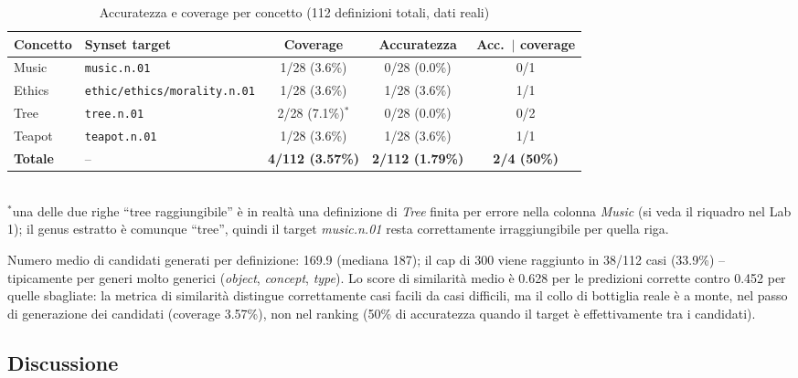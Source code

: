 \documentclass[12pt,a4paper]{article}
\begin{document}
\begin{table}[H]
  \centering
  \caption{Accuratezza e coverage per concetto (112 definizioni totali, dati reali)}
  \begin{tabular}{llccc}
    \toprule
    \textbf{Concetto} & \textbf{Synset target} & \textbf{Coverage} & \textbf{Accuratezza} & \textbf{Acc.\ $|$ coverage} \\
    \midrule
    Music  & \texttt{music.n.01}                              & 1/28 (3.6\%) & 0/28 (0.0\%) & 0/1 \\
    Ethics & \texttt{ethic/ethics/morality.n.01}               & 1/28 (3.6\%) & 1/28 (3.6\%) & 1/1 \\
    Tree   & \texttt{tree.n.01}                                & 2/28 (7.1\%)$^*$ & 0/28 (0.0\%) & 0/2 \\
    Teapot & \texttt{teapot.n.01}                              & 1/28 (3.6\%) & 1/28 (3.6\%) & 1/1 \\
    \midrule
    \textbf{Totale} & -- & \textbf{4/112 (3.57\%)} & \textbf{2/112 (1.79\%)} & \textbf{2/4 (50\%)} \\
    \bottomrule
  \end{tabular}
  \\[0.3em]
  {\footnotesize $^*$una delle due righe ``tree raggiungibile'' \`e in realt\`a una definizione di \textit{Tree} finita per errore nella colonna \textit{Music} (si veda il riquadro nel Lab 1); il genus estratto \`e comunque ``tree'', quindi il target \emph{music.n.01} resta correttamente irraggiungibile per quella riga.}
\end{table}

Numero medio di candidati generati per definizione: 169.9 (mediana 187); il cap di 300 viene raggiunto in 38/112 casi (33.9\%) -- tipicamente per generi molto generici (\textit{object}, \textit{concept}, \textit{type}). Lo score di similarit\`a medio \`e 0.628 per le predizioni corrette contro 0.452 per quelle sbagliate: la metrica di similarit\`a distingue correttamente casi facili da casi difficili, ma il collo di bottiglia reale \`e a monte, nel passo di generazione dei candidati (coverage 3.57\%), non nel ranking (50\% di accuratezza quando il target \`e effettivamente tra i candidati).

\subsection{Discussione}
\end{document}
